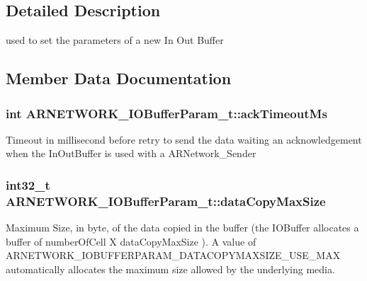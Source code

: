 \subsection{Detailed Description}
used to set the parameters of a new In Out Buffer 

\subsection{Member Data Documentation}
\subsubsection[{\texorpdfstring{ack\+Timeout\+Ms}{ackTimeoutMs}}]{\setlength{\rightskip}{0pt plus 5cm}int A\+R\+N\+E\+T\+W\+O\+R\+K\+\_\+\+I\+O\+Buffer\+Param\+\_\+t\+::ack\+Timeout\+Ms}\hypertarget{struct_a_r_n_e_t_w_o_r_k___i_o_buffer_param__t_addba140ff9ca65ed07b271aedbbda9cf}{}\label{struct_a_r_n_e_t_w_o_r_k___i_o_buffer_param__t_addba140ff9ca65ed07b271aedbbda9cf}
Timeout in millisecond before retry to send the data waiting an acknowledgement when the In\+Out\+Buffer is used with a A\+R\+Network\+\_\+\+Sender 
\subsubsection[{\texorpdfstring{data\+Copy\+Max\+Size}{dataCopyMaxSize}}]{\setlength{\rightskip}{0pt plus 5cm}int32\+\_\+t A\+R\+N\+E\+T\+W\+O\+R\+K\+\_\+\+I\+O\+Buffer\+Param\+\_\+t\+::data\+Copy\+Max\+Size}\hypertarget{struct_a_r_n_e_t_w_o_r_k___i_o_buffer_param__t_a308f4f73ba7ce16c4f5541289c79ed9e}{}\label{struct_a_r_n_e_t_w_o_r_k___i_o_buffer_param__t_a308f4f73ba7ce16c4f5541289c79ed9e}
Maximum Size, in byte, of the data copied in the buffer (the I\+O\+Buffer allocates a buffer of number\+Of\+Cell X data\+Copy\+Max\+Size ). A value of A\+R\+N\+E\+T\+W\+O\+R\+K\+\_\+\+I\+O\+B\+U\+F\+F\+E\+R\+P\+A\+R\+A\+M\+\_\+\+D\+A\+T\+A\+C\+O\+P\+Y\+M\+A\+X\+S\+I\+Z\+E\+\_\+\+U\+S\+E\+\_\+\+M\+AX automatically allocates the maximum size allowed by the underlying media. 
